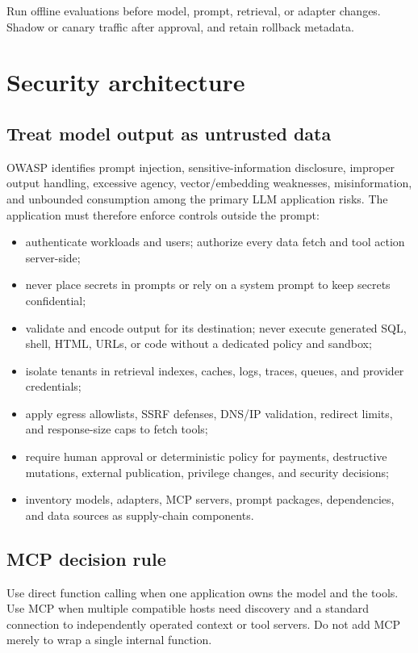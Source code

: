 \documentclass[10pt]{article}
\begin{document}
Run offline evaluations before model, prompt, retrieval, or adapter changes. Shadow or canary traffic after approval, and retain rollback metadata.

\section{Security architecture}

\subsection{Treat model output as untrusted data}

OWASP identifies prompt injection, sensitive-information disclosure, improper output handling, excessive agency, vector/embedding weaknesses, misinformation, and unbounded consumption among the primary LLM application risks.\cite{owasp-top10} The application must therefore enforce controls outside the prompt:

\begin{itemize}
  \item authenticate workloads and users; authorize every data fetch and tool action server-side;
  \item never place secrets in prompts or rely on a system prompt to keep secrets confidential;
  \item validate and encode output for its destination; never execute generated SQL, shell, HTML, URLs, or code without a dedicated policy and sandbox;
  \item isolate tenants in retrieval indexes, caches, logs, traces, queues, and provider credentials;
  \item apply egress allowlists, SSRF defenses, DNS/IP validation, redirect limits, and response-size caps to fetch tools;
  \item require human approval or deterministic policy for payments, destructive mutations, external publication, privilege changes, and security decisions;
  \item inventory models, adapters, MCP servers, prompt packages, dependencies, and data sources as supply-chain components.
\end{itemize}

\subsection{MCP decision rule}

Use direct function calling when one application owns the model and the tools. Use MCP when multiple compatible hosts need discovery and a standard connection to independently operated context or tool servers. Do not add MCP merely to wrap a single internal function.
\end{document}

